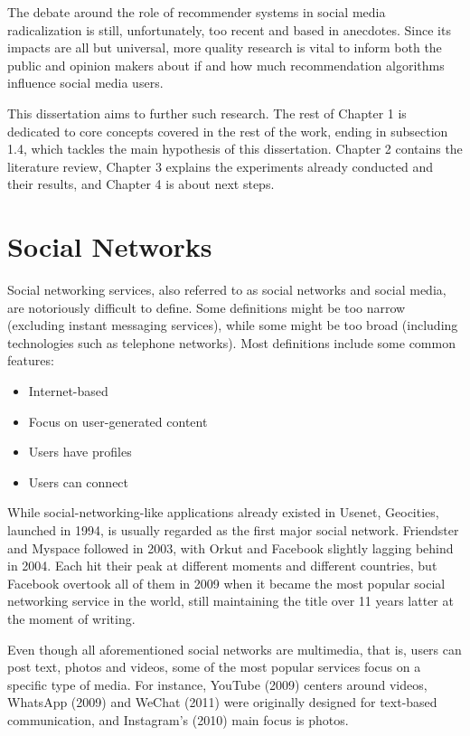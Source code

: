 The debate around the role of recommender systems in social media radicalization
is still, unfortunately, too recent and based in anecdotes. Since its impacts
are all but universal, more quality research is vital to inform both the public
and opinion makers about if and how much recommendation algorithms influence
social media users.

This dissertation aims to further such research. The rest of Chapter 1 is
dedicated to core concepts covered in the rest of the work, ending in subsection
1.4, which tackles the main hypothesis of this dissertation. Chapter 2 contains
the literature review, Chapter 3 explains the experiments already conducted and
their results, and Chapter 4 is about next steps.

\section{Social Networks}
\label{sec:social_networks}

Social networking services, also referred to as social networks and social
media, are notoriously difficult to define. Some definitions might be too narrow
(excluding instant messaging services), while some might be too broad (including
technologies such as telephone networks). Most definitions include some common
features:

\begin{itemize}
  \item Internet-based
  \item Focus on user-generated content
  \item Users have profiles
  \item Users can connect
\end{itemize}

While social-networking-like applications already existed in Usenet, Geocities,
launched in 1994, is usually regarded as the first major social network.
Friendster and Myspace followed in 2003, with Orkut and Facebook slightly
lagging behind in 2004. Each hit their peak at different moments and different
countries, but Facebook overtook all of them in 2009 when it became the most
popular social networking service in the world, still maintaining the title over
11 years latter at the moment of writing.

Even though all aforementioned social networks are multimedia, that is, users
can post text, photos and videos, some of the most popular services focus on a
specific type of media. For instance, YouTube (2009) centers around videos,
WhatsApp (2009) and WeChat (2011) were originally designed for text-based
communication, and Instagram's (2010) main focus is photos.


